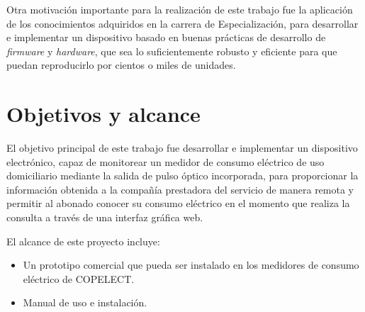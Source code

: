 Otra motivación importante para la realización de este trabajo fue la aplicación de los conocimientos adquiridos en la carrera de Especialización, para desarrollar e implementar un dispositivo basado en buenas prácticas de desarrollo de \textit{firmware} y \textit{hardware}, que sea lo suficientemente robusto y eficiente para que puedan reproducirlo por cientos o miles de unidades.


\section{Objetivos y alcance}

El objetivo principal de este trabajo fue desarrollar e implementar un dispositivo electrónico, capaz de monitorear un medidor de consumo eléctrico de uso domiciliario mediante la salida de pulso óptico incorporada, para proporcionar la información obtenida a la compañía prestadora del servicio de manera remota y permitir al abonado conocer su consumo eléctrico en el momento que realiza la consulta a través de una interfaz gráfica web.

El alcance de este proyecto incluye:

\begin{itemize}
	\item Un prototipo comercial que pueda ser instalado en los medidores de consumo eléctrico de COPELECT.
	\item Manual de uso e instalación.
\end{itemize}